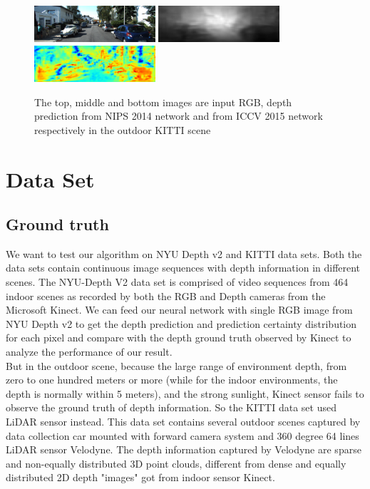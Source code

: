 \documentclass[letterpaper, 10 pt, conference]{ieeeconf}
\begin{document}
\begin{figure}
\centering
\includegraphics[width=0.4\textwidth]{KITTI0.png}
\includegraphics[width=0.4\textwidth]{KITTI0_predict.png}
\includegraphics[width=0.4\textwidth]{KITTI0_prediction.png}
\caption{\label{fig:kittioutput}The top, middle and bottom images are input RGB, depth prediction from NIPS 2014 network and from ICCV 2015 network respectively in the outdoor KITTI scene}
\end{figure}
\section{Data Set}
\subsection{Ground truth}
We want to test our algorithm on NYU Depth v2\cite{Silberman:ECCV12} and KITTI\cite{Geiger2013IJRR} data sets. Both the data sets contain continuous image sequences with depth information in  different scenes. The NYU-Depth V2 data set is comprised of video sequences from 464 indoor scenes as recorded by both the RGB and Depth cameras from the Microsoft Kinect. We can feed our neural network with single RGB image from NYU Depth v2 to get the depth prediction and prediction certainty distribution for each pixel and compare with the depth ground truth observed by Kinect to analyze the performance of our result. \\

But in the outdoor scene, because the large range of environment depth, from zero to one hundred meters or more (while for the indoor environments, the depth is normally within 5 meters), and the strong sunlight, Kinect sensor fails to observe the ground truth of depth information. So the KITTI data set used LiDAR sensor instead. This data set contains several outdoor scenes captured by data collection car mounted with forward camera system and 360 degree 64 lines LiDAR sensor Velodyne. The depth information captured by Velodyne are sparse and non-equally distributed 3D point clouds, different from dense and equally distributed 2D depth "images" got from indoor sensor Kinect.\\
\end{document}
